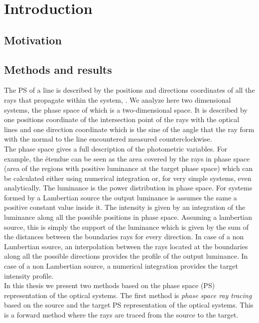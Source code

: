 \chapter{Introduction}

\section{Motivation}
\section{Methods and results}
The PS of a line is described by the positions and directions coordinates of all the rays that propagate within the system, \cite{testorf2009phase}. We analyze here two dimensional systems, the phase space of which is a two-dimensional space. It is described by one positions coordinate of the intersection point of the rays with the optical lines and one direction coordinate which is the sine of the angle that the ray form with the normal to the line encountered measured counterclockwise. 
\\ \indent The phase space gives a full description of the photometric variables. 
For example, the \'{e}tendue can be seen as the area covered by the rays in phase space (area of the regions with positive luminance at the target phase space) which can be calculated either using numerical integration or, for very simple systems, even analytically. The luminance is the power distribution in phase space. For systems formed by a Lambertian source the output luminance is assumes the same a positive constant value inside it. The intensity is given by an integration of the luminance along all the possible positions in phase space. Assuming a lambertian source, this is simply the support of the luminance which is given by the sum of the distances between the boundaries rays for every direction. 
In case of a non Lambertian source, an interpolation between the rays located at the boundaries along all the possible directions provides the profile of the output luminance. In case of a non Lambertian source, a numerical integration provides the target intensity profile. 
\\ \indent 
In this thesis we present two methods based on the phase space (PS) representation of the optical systems. The first method is \textit{phase space ray tracing} based on the source and the target PS representation of the optical systems. This is a forward method where the rays are traced from the source to the target.
